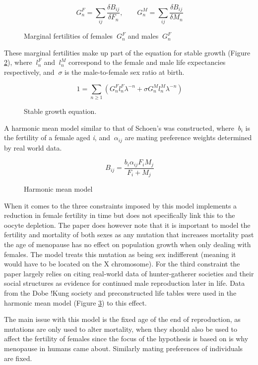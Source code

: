 \documentclass[authoryearcitations]{UoYCSproject}
\begin{document}
\begin{figure}[h]
$$\ G^F_n = \sum_{ij} \frac{\delta B_{ij}}{\delta F_n}, \qquad G^M_n = \sum_{ij} \frac{\delta B_{ij}}{\delta M_n}$$
\caption{Marginal fertilities of females $\ G_n^F $ and males $\ G_n^F $ }
\label{fig:marginalFertilities}
\end{figure}

These marginal fertilities make up part of the equation for stable growth (Figure \ref{fig:stableGrowth}), where $\ l_n^F $ and $\ l_n^M $ correspond to the female and male life expectancies respectively, and $\ \sigma $ is the male-to-female sex ratio at birth.

\begin{figure}[h]
$$\ 1 = \sum_{n\geq 1}(G_n^Fl_n^F\lambda ^{-n} + \sigma G_n^Ml_n^M\lambda ^{-n}) $$
\caption{Stable growth equation.}
\label{fig:stableGrowth}
\end{figure}


A harmonic mean model similar to that of Schoen's \cite{schoen1981harmonic} was constructed, where $\ b_i $ is the fertility of a female aged \textit{i}, and $\ \alpha_{ij} $ are mating preference weights determined by real world data.

\begin{figure}[h]
$$\ B_{ij} = \frac{b_i\alpha_{ij}F_iM_j}{F_i + M_j} $$
\caption{Harmonic mean model}
\label{fig:harmonicMean}
\end{figure}

When it comes to the three constraints imposed by \cite{patriarchHypothesis2000} this model implements a reduction in female fertility in time but does not specifically link this to the oocyte depletion. The paper does however note that it is important to model the fertility and mortality of both sexes as any mutation that increases mortality past the age of menopause has no effect on population growth when only dealing with females. The model treats this mutation as being sex indifferent (meaning it would have to be located on the X chromosome). For the third constraint the paper largely relies on citing real-world data of hunter-gatherer societies and their social structures as evidence for continued male reproduction later in life. Data from the Dobe !Kung society \cite{howell1979demography} and preconstructed life tables \cite{gurven2007hunter} were used in the harmonic mean model (Figure \ref{fig:harmonicMean}) to this effect.

The main issue with this model is the fixed age of the end of reproduction, as mutations are only used to alter mortality, when they should also be used to affect the fertility of females since the focus of the hypothesis is based on is why menopause in humans came about. Similarly mating preferences of individuals are fixed.
\end{document}
